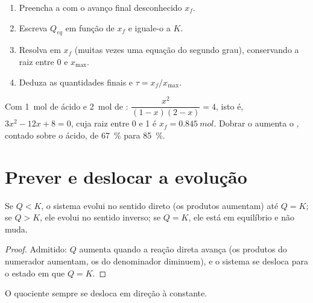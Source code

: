 \begin{method}\label{met:g12:equilibrium:final}
\begin{enumerate}
  \item Preencha a  com o avanço final desconhecido
        $x_f$.
  \item Escreva $Q_{eq}$ em função de $x_f$ e iguale-o a $K$.
  \item Resolva em $x_f$ (muitas vezes uma equação do segundo grau),
        conservando a raiz entre 0 e $x_{\max}$.
  \item Deduza as quantidades finais e $\tau = x_f/x_{\max}$.
\end{enumerate}
\end{method}

\begin{example}\label{ex:g12:equilibrium:excess}
Com \qty{1}{mol} de ácido e \qty{2}{mol} de :
$\dfrac{x^2}{(1-x)(2-x)} = 4$, isto é, $3x^2 - 12x + 8 = 0$, cuja raiz
entre 0 e 1 é $x_f = \qty{0.845}{mol}$. Dobrar o  aumenta o
, contado sobre o ácido, de \qty{67}{\percent} para
\qty{85}{\percent}.
\end{example}

\section{Prever e deslocar a evolução}

\begin{proposition}\label{prop:g12:equilibrium:direction}
Se $Q < K$, o sistema evolui no sentido direto (os produtos aumentam)
até $Q = K$; se $Q > K$, ele evolui no sentido inverso; se $Q = K$, ele
está em equilíbrio e não muda.
\end{proposition}

\begin{proof}
Admitido: $Q$ aumenta quando a reação direta avança (os produtos do
numerador aumentam, os  do denominador diminuem), e o sistema
se desloca para o estado em que $Q = K$.
\end{proof}

\begin{omfigure}

{\small O quociente sempre se desloca em direção à constante.}
\end{omfigure}

